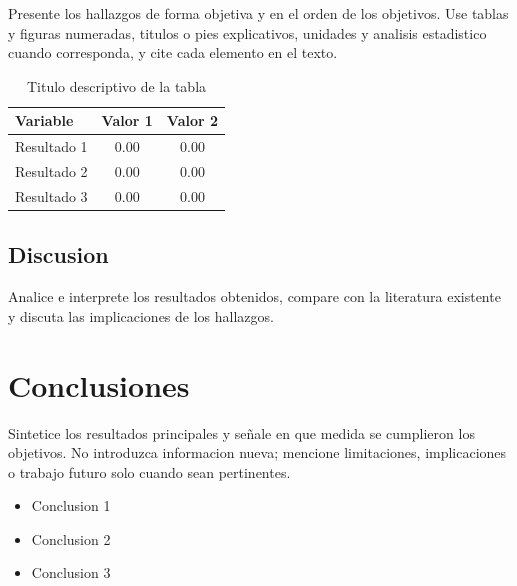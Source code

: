 \documentclass[11pt,a4paper]{article}
\begin{document}
\begin{sectioncontent}
Presente los hallazgos de forma objetiva y en el orden de los objetivos. Use tablas y figuras numeradas, titulos o pies explicativos, unidades y analisis estadistico cuando corresponda, y cite cada elemento en el texto.

\begin{table}[H]
    \centering
    \caption{Titulo descriptivo de la tabla}
    \label{tab:ejemplo}
    \begin{tabular}{@{}lcc@{}}
        \toprule
        \textbf{Variable} & \textbf{Valor 1} & \textbf{Valor 2} \\
        \midrule
        Resultado 1 & 0.00 & 0.00 \\
        Resultado 2 & 0.00 & 0.00 \\
        Resultado 3 & 0.00 & 0.00 \\
        \bottomrule
    \end{tabular}
\end{table}

\subsection*{Discusion}
Analice e interprete los resultados obtenidos, compare con la literatura existente y discuta las implicaciones de los hallazgos.
\end{sectioncontent}

\vspace{10pt}

\section{Conclusiones}

\begin{sectioncontent}
Sintetice los resultados principales y señale en que medida se cumplieron los objetivos. No introduzca informacion nueva; mencione limitaciones, implicaciones o trabajo futuro solo cuando sean pertinentes.

\begin{itemize}
    \item Conclusion 1
    \item Conclusion 2
    \item Conclusion 3
\end{itemize}
\end{sectioncontent}
\end{document}
